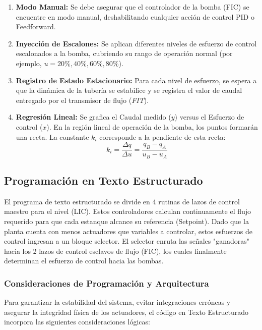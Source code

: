 \begin{enumerate}
    \item \textbf{Modo Manual:} Se debe asegurar que el controlador de la bomba (FIC) se encuentre en modo manual, deshabilitando cualquier acción de control PID o Feedforward.
    \item \textbf{Inyección de Escalones:} Se aplican diferentes niveles de esfuerzo de control escalonados a la bomba, cubriendo su rango de operación normal (por ejemplo, $u = 20\%, 40\%, 60\%, 80\%$).
    \item \textbf{Registro de Estado Estacionario:} Para cada nivel de esfuerzo, se espera a que la dinámica de la tubería se estabilice y se registra el valor de caudal entregado por el transmisor de flujo (\textit{FIT}).
    \item \textbf{Regresión Lineal:} Se grafica el Caudal medido ($y$) versus el Esfuerzo de control ($x$). En la región lineal de operación de la bomba, los puntos formarán una recta. La constante $k_i$ corresponde a la pendiente de esta recta:
    \begin{equation}
        k_i = \frac{\Delta q}{\Delta u} = \frac{q_B - q_A}{u_B - u_A}
    \end{equation}
\end{enumerate}
\subsection{Programación en Texto Estructurado}
El programa de texto estructurado se divide en 4 rutinas de lazos de control maestro para el nivel (LIC). Estos controladores calculan continuamente el flujo requerido para que cada estanque alcance su referencia (Setpoint). Dado que la planta cuenta con menos actuadores que variables a controlar, estos esfuerzos de control ingresan a un bloque selector. El selector enruta las señales "ganadoras" hacia los 2 lazos de control esclavos de flujo (FIC), los cuales finalmente determinan el esfuerzo de control hacia las bombas.

\subsubsection{Consideraciones de Programación y Arquitectura} 
Para garantizar la estabilidad del sistema, evitar integraciones erróneas y asegurar la integridad física de los actuadores, el código en Texto Estructurado incorpora las siguientes consideraciones lógicas:

